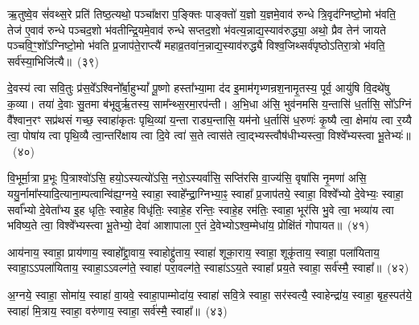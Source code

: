 ऋ॒तुष्वे॒व सं॑वथ्स॒रे प्रति॑ तिष्ठ॒त्यथो॒ पञ्चा᳚क्षरा प॒ङ्क्तिः पाङ्क्तो॑ य॒ज्ञो य॒ज्ञमे॒वाव॑ रुन्धे त्रि॒वृद॑ग्निष्टो॒मो भ॑वति॒ तेज॑ ए॒वाव॑ रुन्धे पञ्चद॒शो भ॑वतीन्द्रि॒यमे॒वाव॑ रुन्धे सप्तद॒शो भ॑वत्य॒न्नाद्य॒स्याव॑रुद्ध्या॒ अथो॒ प्रैव तेन॑ जायते पञ्चवि॒ꣳ॒शो᳚\-ऽग्निष्टो॒मो भ॑वति प्र॒जाप॑ते॒राप्त्यै॑ महाव्र॒तवा॑न॒न्नाद्य॒स्याव॑रुद्ध्यै विश्व॒जिथ्सर्व॑पृष्ठो\-ऽतिरा॒त्रो भ॑वति॒ सर्व॑स्या॒भिजि॑त्यै॥~(३९)

{\anuvakamend[{ते व्याव॑र्तन्त प्रवदि॒ता स्या॒मिति॒ स ए॒तम्प़॑ञ्चरा॒त्रमा सं॑वथ्स॒रो॑\-ऽभिजि॑त्यै}]}%

दे॒वस्य॑ त्वा सवि॒तुः प्र॑स॒वे᳚\-ऽश्विनो᳚र्बा॒हु\-भ्यां᳚ पू॒ष्णो हस्ता᳚भ्या॒मा द॑द इ॒माम॑गृभ्णन्रश॒नामृ॒तस्य॒ पूर्व॒ आयु॑षि वि॒दथे॑षु क॒व्या। तया॑ दे॒वाः सु॒तमा ब॑भूवुर्\mbox{}ऋ॒तस्य॒ साम᳚न्थ्स॒रमा॒रप॑न्ती। अ॒भि॒धा अ॑सि॒ भुव॑नमसि य॒न्तासि॑ ध॒र्तासि॒ सो᳚\-ऽग्निं वै᳚श्वान॒रꣳ सप्र॑थसं गच्छ॒ स्वाहा॑कृतः पृथि॒व्यां य॒न्ता राड्य॒न्तासि॒ यम॑नो ध॒र्तासि॑ ध॒रुणः॑ कृ॒ष्यै त्वा॒ क्षेमा॑य त्वा र॒य्यै त्वा॒ पोषा॑य त्वा पृथि॒व्यै त्वा॒न्तरि॑क्षाय त्वा दि॒वे त्वा॑ स॒ते त्वास॑ते त्वा॒द्भ्यस्त्वौष॑धीभ्यस्त्वा॒ विश्वे᳚भ्यस्त्वा भू॒तेभ्यः॑॥~(४०)

{\anuvakamend[{ध॒रुणः॒ प़ञ्च॑विꣳशतिश्च}]}%

वि॒भूर्मा॒त्रा प्र॒भूः पि॒त्राश्वो॑\-ऽसि॒ हयो॒\-ऽस्यत्यो॑\-ऽसि॒ नरो॒\-ऽस्यर्वा॑सि॒ सप्ति॑रसि वा॒ज्य॑सि॒ वृषा॑सि नृ॒मणा॑ असि॒ ययु॒र्नामा᳚स्यादि॒त्याना॒म्पत्वान्वि॑ह्य॒ग्नये॒ स्वाहा॒ स्वाहे᳚न्द्रा॒ग्निभ्या॒ꣴ॒ स्वाहा᳚ प्र॒जाप॑तये॒ स्वाहा॒ विश्वे᳚भ्यो दे॒वेभ्यः॒ स्वाहा॒ सर्वा᳚भ्यो दे॒वेता᳚भ्य इ॒ह धृतिः॒ स्वाहे॒ह विधृ॑तिः॒ स्वाहे॒ह रन्तिः॒ स्वाहे॒ह रम॑तिः॒ स्वाहा॒ भूर॑सि भु॒वे त्वा॒ भव्या॑य त्वा भविष्य॒ते त्वा॒ विश्वे᳚भ्यस्त्वा भू॒तेभ्यो॒ देवा॑ आशापाला ए॒तं दे॒वेभ्यो\-ऽश्व॒म्मेधा॑य॒ प्रोक्षि॑तं गोपायत॥~(४१)

{\anuvakamend[{रन्तिः॒ स्वाहा॒ द्वाविꣳ॑शतिश्च}]}%

आय॑नाय॒ स्वाहा॒ प्राय॑णाय॒ स्वाहो᳚द्द्रा॒वाय॒ स्वाहोद्द्रु॑ताय॒ स्वाहा॑ शूका॒राय॒ स्वाहा॒ शूकृ॑ताय॒ स्वाहा॒ पला॑यिताय॒ स्वाहा॒\-ऽ\-ऽपला॑यिताय॒ स्वाहा॒\-ऽ\-ऽवल्ग॑ते॒ स्वाहा॑ परा॒वल्ग॑ते॒ स्वाहा॑\-ऽ\-ऽय॒ते स्वाहा᳚ प्रय॒ते स्वाहा॒ सर्व॑स्मै॒ स्वाहा᳚॥~(४२)

{\anuvakamend[{आय॑ना॒योत्त॑रमा॒पला॑यिताय॒ षड्विꣳ॑शतिः}]}%

अ॒ग्नये॒ स्वाहा॒ सोमा॑य॒ स्वाहा॑ वा॒यवे॒ स्वाहा॒पाम्मोदा॑य॒ स्वाहा॑ सवि॒त्रे स्वाहा॒ सर॑स्वत्यै॒ स्वाहेन्द्रा॑य॒ स्वाहा॒ बृह॒स्पत॑ये॒ स्वाहा॑ मि॒त्राय॒ स्वाहा॒ वरु॑णाय॒ स्वाहा॒ सर्व॑स्मै॒ स्वाहा᳚॥~(४३)

